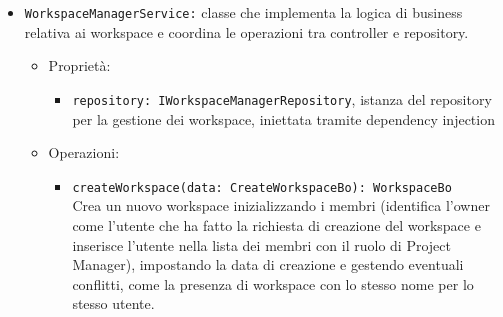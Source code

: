 \documentclass[a4paper, 11pt]{article}
\begin{document}
\begin{itemize}
\begin{itemize}
\begin{itemize}
\begin{itemize}
          \end{itemize}
          \item Operazioni:
        
          \begin{itemize}
              \item \texttt{create(dto: CreateWorkspaceDto, user: RequestUser): CreateWorkspaceResponseDto} \\
              Riceve la richiesta di creazione di un workspace da parte di un utente autenticato, delega la logica al service e restituisce i dati del workspace creato.
              
              \item \texttt{delete(workspaceId: string, user: RequestUser): void} \\
              Gestisce la richiesta di eliminazione di un workspace, delegando al service la verifica dei permessi e l'esecuzione dell'operazione.
              
              \item \texttt{list(user: RequestUser): WorkspaceResponseDto[]} \\
              Restituisce la lista dei workspace di cui l'utente è membro.
          \end{itemize}
        \end{itemize}
        
        \item \texttt{WorkspaceManagerService:} classe che implementa la logica di business relativa ai workspace e coordina le operazioni tra controller e repository.
        \begin{itemize}
          \item Proprietà:
          \begin{itemize}
            \item \texttt{repository: IWorkspaceManagerRepository}, istanza del repository per la gestione dei workspace, iniettata tramite dependency injection

          \end{itemize}
          \item Operazioni:
          \begin{itemize}
              \item \texttt{createWorkspace(data: CreateWorkspaceBo): WorkspaceBo} \\
              Crea un nuovo workspace inizializzando i membri (identifica l'owner come l'utente che ha fatto la richiesta di creazione del workspace e inserisce l'utente nella lista dei membri con il ruolo di Project Manager), impostando la data di creazione e gestendo eventuali conflitti, come la presenza di workspace con lo stesso nome per lo stesso utente.
              

\end{itemize}
\end{itemize}
\end{itemize}
\end{itemize}
\end{document}
